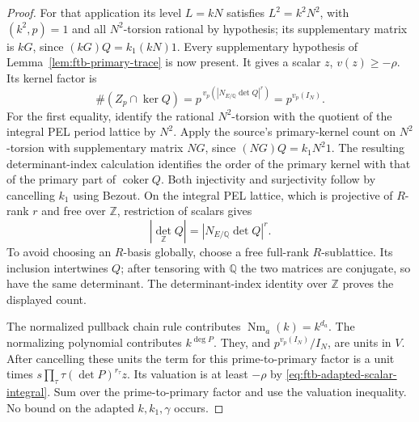 \begin{proof}
For that application its level \(L=kN\) satisfies
\(L^2=k^2N^2\), with \((k^2,p)=1\) and all \(N^2\)-torsion
rational by hypothesis; its supplementary matrix is \(kG\),
since \((kG)Q=k_1(kN)1\).  Every supplementary hypothesis of
Lemma~\ref{lem:ftb-primary-trace} is now present.
It gives a scalar \(z\), \(v(z)\ge-\rho\).
Its kernel factor is
\[
  \#(Z_p\cap\ker Q)
      =p^{\,v_p(|N_{E/\mathbb Q}\det Q|^r)}
      =p^{v_p(I_N)} .
\]
For the first equality, identify the rational \(N^2\)-torsion with
the quotient of the integral PEL period lattice by \(N^2\).
Apply the source's primary-kernel count on \(N^2\)-torsion
with supplementary matrix \(NG\), since
\((NG)Q=k_1N^2 1\).
The resulting determinant-index calculation identifies the order
of the primary kernel with that of the primary part of
\(\operatorname{coker}Q\).
Both injectivity and surjectivity follow by cancelling \(k_1\)
using Bezout.
On the integral PEL lattice, which is projective of \(R\)-rank \(r\)
and free over \(\mathbb Z\), restriction of scalars gives
\[
            |\det_{\mathbb Z}Q|
                    =|N_{E/\mathbb Q}\det Q|^r .
\]
To avoid choosing an \(R\)-basis globally, choose a free
full-rank \(R\)-sublattice.  Its inclusion intertwines \(Q\);
after tensoring with \(\mathbb Q\) the two matrices are conjugate,
so have the same determinant.
The determinant-index identity over \(\mathbb Z\) proves the
displayed count.

The normalized pullback chain rule contributes
\(\operatorname{Nm}_a(k)=k^{d_a}\).
The normalizing polynomial contributes \(k^{\deg P}\).
They, and \(p^{v_p(I_N)}/I_N\), are units in \(V\).
After cancelling these units the term for this prime-to-primary
factor is a unit times
\(s\prod_\tau\tau(\det P)^{r_\tau}z\).
Its valuation is at least \(-\rho\) by
\eqref{eq:ftb-adapted-scalar-integral}.
Sum over the prime-to-primary factor and use the valuation
inequality.  No bound on the adapted \(k,k_1,\gamma\) occurs.
\end{proof}

